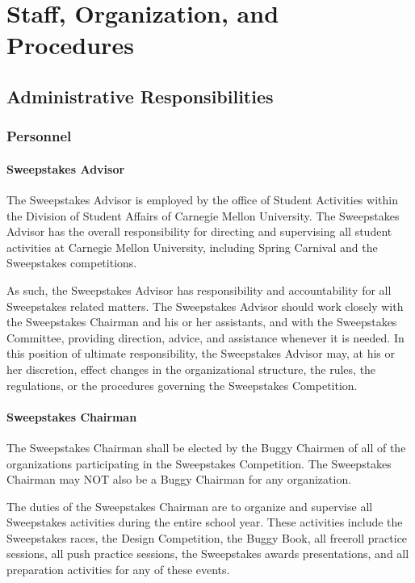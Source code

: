\chapter{Staff, Organization, and Procedures}

\section{Administrative Responsibilities}

\subsection{Personnel}

\subsubsection{Sweepstakes Advisor}

	The Sweepstakes Advisor is employed by the office of Student Activities within
	the Division of Student Affairs of Carnegie Mellon University. The Sweepstakes
	Advisor has the overall responsibility for directing and supervising all
	student activities at Carnegie Mellon University, including Spring Carnival and
	the Sweepstakes competitions.

	As such, the Sweepstakes Advisor has responsibility and accountability for all Sweepstakes
	related matters. The Sweepstakes Advisor should work closely with the Sweepstakes Chairman
	and his or her assistants, and with the Sweepstakes Committee, providing
	direction, advice, and assistance whenever it is needed. In this position of
	ultimate responsibility, the Sweepstakes Advisor may, at his or her discretion,
	effect changes in the organizational structure, the rules, the regulations, or
	the procedures governing the Sweepstakes Competition.

\subsubsection{Sweepstakes Chairman}

	The Sweepstakes Chairman shall be elected by the Buggy Chairmen of all of the
	organizations participating in the Sweepstakes Competition. The Sweepstakes
	Chairman may NOT also be a Buggy Chairman for any organization.

	The duties of the Sweepstakes Chairman are to organize and supervise all
	Sweepstakes activities during the entire school year. These activities include
	the Sweepstakes races, the Design Competition, the Buggy Book, all freeroll
	practice sessions, all push practice sessions, the Sweepstakes awards
	presentations, and all preparation activities for any of these events.

